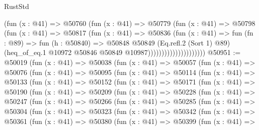 \begin{lexlean}{RustStd}
\begin{coremodule}
                                (fun (x : @41) =>
                                @50760
                                  (fun (x : @41) =>
                                  @50779
                                    (fun (x : @41) =>
                                    @50798
                                      (fun (x : @41) =>
                                      @50817
                                        (fun (x : @41) =>
                                        @50836
                                          (fun (x : @41) =>
                                          fun (fn : @89) =>
                                          fun (h : @50840) =>
                                          @50848
                                            @50849
                                            (Eq.refl.{2} (Sort 1) @89)
                                            (heq_of_eq.{1}
                                              @10972
                                              @50846
                                              @50849
                                              @10987)))))))))))))))))))))
@50951 := @50019
    (fun (x : @41) =>
    @50038
      (fun (x : @41) =>
      @50057
        (fun (x : @41) =>
        @50076
          (fun (x : @41) =>
          @50095
            (fun (x : @41) =>
            @50114
              (fun (x : @41) =>
              @50133
                (fun (x : @41) =>
                @50152
                  (fun (x : @41) =>
                  @50171
                    (fun (x : @41) =>
                    @50190
                      (fun (x : @41) =>
                      @50209
                        (fun (x : @41) =>
                        @50228
                          (fun (x : @41) =>
                          @50247
                            (fun (x : @41) =>
                            @50266
                              (fun (x : @41) =>
                              @50285
                                (fun (x : @41) =>
                                @50304
                                  (fun (x : @41) =>
                                  @50323
                                    (fun (x : @41) =>
                                    @50342
                                      (fun (x : @41) =>
                                      @50361
                                        (fun (x : @41) =>
                                        @50380
                                          (fun (x : @41) =>
                                          @50399
                                            (fun (x : @41) =>

\end{coremodule}
\end{lexlean}
